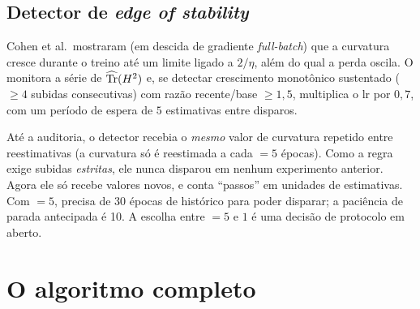 \subsection{Detector de \emph{edge of stability}}
Cohen et al.\ mostraram (em descida de gradiente \emph{full-batch}) que a curvatura cresce durante o treino até um limite ligado a $2/\eta$, além do qual a perda oscila. O  monitora a série de $\widehat{\operatorname{Tr}}(H^2)$ e, se detectar crescimento monotônico sustentado ($\ge4$ subidas consecutivas) com razão recente/base $\ge1{,}5$, multiplica o lr por $0{,}7$, com um período de espera de $5$ estimativas entre disparos.

\begin{alerta}
Até a auditoria, o detector recebia o \emph{mesmo} valor de curvatura repetido entre reestimativas (a curvatura só é reestimada a cada $=5$ épocas). Como a regra exige subidas \emph{estritas}, ele nunca disparou em nenhum experimento anterior. Agora ele só recebe valores novos, e conta ``passos'' em unidades de estimativas. Com $=5$, precisa de 30 épocas de histórico para poder disparar; a paciência de parada antecipada é 10. A escolha entre $=5$ e $1$ é uma decisão de protocolo em aberto.
\end{alerta}

\section{O algoritmo completo}\label{sec:algoritmo}

